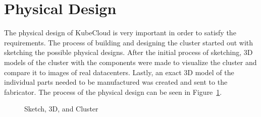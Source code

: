 
\section{Physical Design}
The physical design of KubeCloud is very important in order to satisfy the requirements. The process of building and designing the cluster started out with sketching the possible physical designs. After the initial process of sketching, 3D models of the cluster with the components were made to visualize the cluster and compare it to images of real datacenters. Lastly, an exact 3D model of the individual parts needed to be manufactured was created and sent to the fabricator. The process of the physical design can be seen in Figure~\ref{fig:design_process}.

\begin{figure}[H]%
    \centering
    \qquad
    \qquad
   
    \caption{Sketch, 3D, and Cluster}%
    \label{fig:design_process}%
\end{figure}


